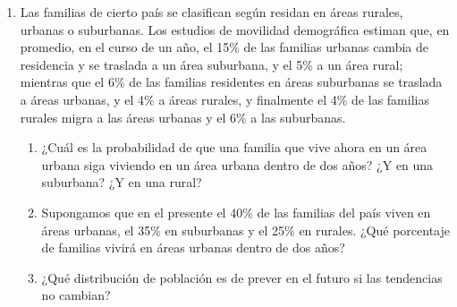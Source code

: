 \documentclass{templateNote}
\begin{document}
\begin{enumerate}[start = 2]
\begin{enumerate}[label=\alph*)]
    \end{enumerate}


    \newpage
    \item Las familias de cierto país se clasifican según residan en áreas rurales, urbanas o
    suburbanas. Los estudios de movilidad demográfica estiman que, en promedio, en el curso de
    un año, el 15\% de las familias urbanas cambia de residencia y se traslada a un área suburbana,
    y el 5\% a un área rural; mientras que el 6\% de las familias residentes en áreas suburbanas se
    traslada a áreas urbanas, y el 4\% a áreas rurales, y finalmente el 4\% de las familias rurales
    migra a las áreas urbanas y el 6\% a las suburbanas.

    \begin{enumerate}[label=\alph*)]
        \item ¿Cuál es la probabilidad de que una familia que vive ahora en un área urbana siga viviendo
        en un área urbana dentro de dos años? ¿Y en una suburbana? ¿Y en una rural?
        \item Supongamos que en el presente el 40\% de las familias del país viven en áreas urbanas, el
        35\% en suburbanas y el 25\% en rurales. ¿Qué porcentaje de familias vivirá en áreas urbanas
        dentro de dos años?
        \item ¿Qué distribución de población es de prever en el futuro si las tendencias no cambian?
    \end{enumerate}
\end{enumerate}
\end{document}
